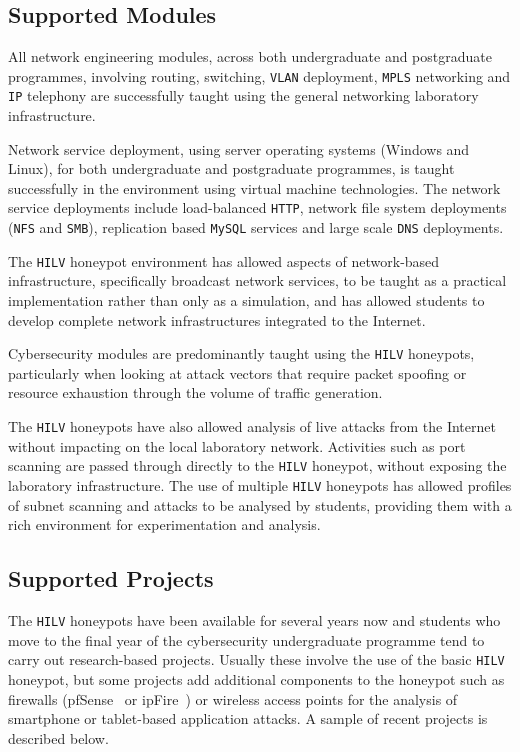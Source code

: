\documentclass{ieeeaccess}
\begin{document}
\subsection{Supported Modules\label{Modules}}

All network engineering modules, across both undergraduate and postgraduate
programmes, involving routing, switching, \texttt{VLAN} deployment,
\texttt{MPLS} networking and \texttt{IP} telephony are successfully taught
using the general networking laboratory infrastructure.

Network service deployment, using server operating systems (Windows and Linux),
for both undergraduate and postgraduate programmes, is taught successfully in
the environment using virtual machine technologies. The network service
deployments include load-balanced \texttt{HTTP}, network file system
deployments (\texttt{NFS} and \texttt{SMB}), replication based \texttt{MySQL}
services and large scale \texttt{DNS} deployments.

The \texttt{HILV} honeypot environment has allowed aspects of network-based
infrastructure, specifically broadcast network services, to be taught as
a practical implementation rather than only as a simulation, and has allowed
students to develop complete network infrastructures integrated to the
Internet.

Cybersecurity modules are predominantly taught using the \texttt{HILV}
honeypots, particularly when looking at attack vectors that require packet
spoofing or resource exhaustion through the volume of traffic generation.

The \texttt{HILV} honeypots have also allowed analysis of live attacks from the
Internet without impacting on the local laboratory network. Activities such as
port scanning are passed through directly to the \texttt{HILV} honeypot, without
exposing the laboratory infrastructure. The use of multiple \texttt{HILV}
honeypots has allowed profiles of subnet scanning and attacks to be analysed by
students, providing them with a rich environment for experimentation and
analysis.

\subsection{Supported Projects\label{Projects}}
The \texttt{HILV} honeypots have been available for several years now and
students who move to the final year of the cybersecurity undergraduate
programme tend to carry out research-based projects. Usually these involve the
use of the basic \texttt{HILV} honeypot, but some projects add additional
components to the honeypot such as firewalls (pfSense~\cite{PFSENSE:18} or
ipFire~\cite{IPFIRE:18}) or wireless access points for the analysis of smartphone or
tablet-based application attacks. A sample of recent projects is described below.
\end{document}

